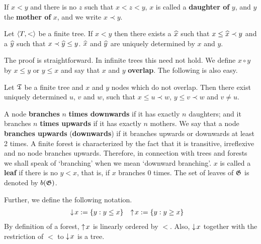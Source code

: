 If $x < y$ and there is no $z$ such that $x < z < y$, $x$ is
called a \textbf{daughter of} $y$, and $y$ the \textbf{mother of} $x$,
and we write $x \prec y$.
\index{$\prec$}%
\begin{lem}
\label{lem:tochter}
Let $\langle T, <\rangle$ be a finite tree. If $x < y$ then
there exists a $\widehat{x}$ such that $x \leq \widehat{x} \prec y$
and a $\widehat{y}$ such that $x \prec \widehat{y} \leq y$.
$\widehat{x}$ and $\widehat{y}$ are uniquely determined by $x$ and $y$.
\proofend
\end{lem}
The proof is straightforward. In infinite trees this need not hold.
We define
$x \circ y$ by $x \leq y$ or $y \leq x$ and say that $x$ and $y$
\textbf{overlap}. The following is also easy.
\index{$\circ$}%
\begin{lem}
\label{lem:vorfahr}
Let $\mathfrak{T}$ be a finite tree and $x$ and $y$ nodes which do not
overlap. Then there exist uniquely determined $u$, $v$ and $w$,
such that $x \leq u \prec w$, $y \leq v \prec w$
and $v \neq u$.
\proofend
\end{lem}
A node \textbf{branches} $n$ \textbf{times downwards} if it has exactly
$n$ daughters; and it branches $n$ \textbf{times upwards} if it has
exactly $n$ mothers. We say that a node \textbf{branches upwards}
(\textbf{downwards}) if it branches upwards or downwards at least 2
times. A finite forest is characterized by the fact that it is
transitive, irreflexive and no node branches upwards. Therefore,
in connection with trees and forests we shall speak of `branching'
when we mean `downward branching'.
$x$ is called a \textbf{leaf} if there is no $y < x$, that is, if
$x$ branches 0 times. The set of leaves of $\mathfrak{G}$ is denoted by
$b(\mathfrak{G})$.

Further, we define the following notation.
\begin{align}
{\downarrow\! x} & := \{y : y \leq x\} &  {\uparrow\! x} & := \{y : y \geq x\}
\end{align}
By definition of a forest, ${\uparrow\! x}$ is linearly ordered by
$<$. Also, ${\downarrow\! x}$ together with the restriction of $<$
to ${\downarrow\! x}$ is a tree.

